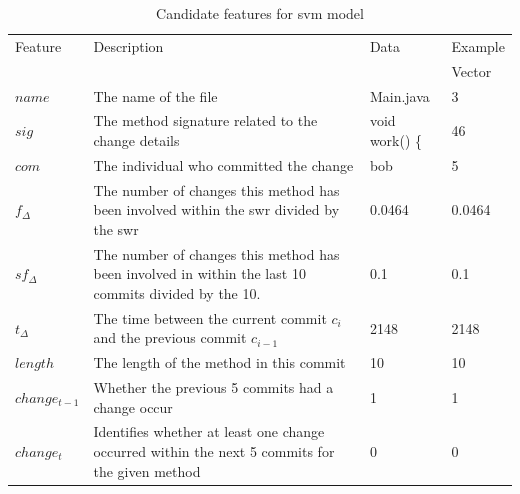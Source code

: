 \begin{table}
\begin{center}
    \begin{tabularx}{\linewidth}{|l|X|l|l|}
        \hline
        Feature & Description & Data & Example \\
         & & & Vector \\
        \hline
        $name$ & The name of the file & Main.java & 3 \\ \hline
        $sig$ & The method signature related to the change details & void work() \{ & 46\\ \hline
        $com$ & The individual who committed the change & bob & 5 \\ \hline
        $f_{\Delta}$ & The number of changes this method has been involved within the \gls{swr} divided by the \gls{swr} & 0.0464 & 0.0464 \\ \hline
        $sf_{\Delta}$ & The number of changes this method has been involved in within the last 10 commits divided by the 10. & 0.1 & 0.1 \\ \hline
        $t_\Delta$ & The time between the current commit $c_i$ and the previous commit $c_{i-1}$ & 2148 & 2148 \\ \hline

        $length$ & The length of the method in this commit & 10 & 10 \\ \hline
        $change_{t-1}$ & Whether the previous 5 commits had a change occur & 1 & 1 \\
        \hline
        $change_{t}$ & Identifies whether at least one change occurred within the next 5 commits for the given method & 0 & 0\\
        \hline
    \end{tabularx}
\end{center}
    \caption{Candidate features for \gls{svm} model}
    \label{tab:candidate_features}
\end{table}


